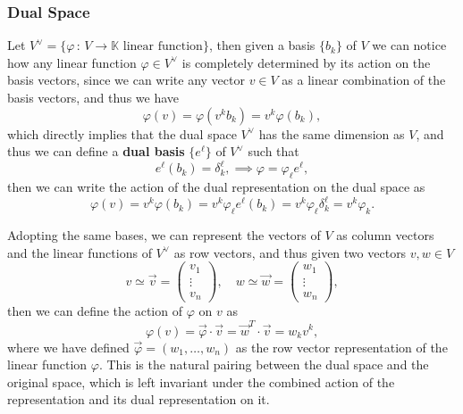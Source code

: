 \subsubsection{Dual Space}

Let \(V^{\vee}=\{\varphi \, : \, V \to \mathbb{K} \text{ linear function}\}\), then given a basis \(\{b_k\}\) of \(V\) we can notice how any linear function \(\varphi \in V^{\vee}\) is completely determined by its action on the basis vectors, since we can write any vector \(v \in V\) as a linear combination of the basis vectors, and thus we have
\[
    \varphi(v) = \varphi(v^k b_k) = v^k \varphi(b_k),
\]
which directly implies that the dual space \(V^{\vee}\) has the same dimension as \(V\), and thus we can define a \textbf{dual basis} \(\{e^{\ell}\}\) of \(V^{\vee}\) such that
\[
    e^\ell(b_k) = \delta^\ell_k, \implies \varphi = \varphi_\ell e^\ell,
\]
then we can write the action of the dual representation on the dual space as
\[
    \varphi(v) = v^k \varphi(b_k) = v^k \varphi_\ell e^\ell(b_k) = v^k \varphi_\ell \delta^\ell_k = v^k \varphi_k.
\]

Adopting the same bases, we can represent the vectors of \(V\) as column vectors and the linear functions of \(V^{\vee}\) as row vectors, and thus given two vectors \(v,w \in V\)
\[
    v \simeq \vec{v} = \begin{pmatrix}
        v_1    \\
        \vdots \\
        v_n
    \end{pmatrix}, \quad w \simeq \vec{w} = \begin{pmatrix}
        w_1    \\
        \vdots \\
        w_n
    \end{pmatrix},
\]
then we can define the action of \(\varphi\) on \(v\) as
\[
    \varphi(v) = \vec{\varphi} \cdot \vec{v} = \vec{w}^T \cdot \vec{v} = w_k v^k,
\]
where we have defined \(\vec{\varphi} = (w_1, \dots, w_n)\) as the row vector representation of the linear function \(\varphi\). This is the natural pairing between the dual space and the original space, which is left invariant under the combined action of the representation and its dual representation on it.

